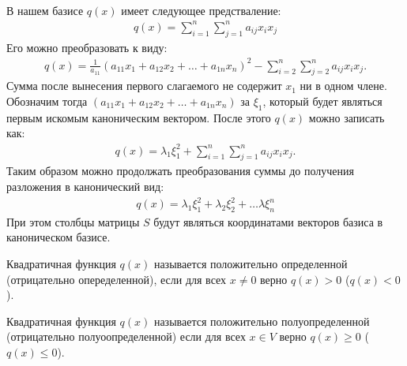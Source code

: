 \begin{algorithm}~\\
    В нашем базисе $q(x)$ имеет следующее предстваление:
    \begin{gather*}
        q(x) = \sum_{i=1}^{n}\sum_{j=1}^{n} a_{ij}x_i x_j
    \end{gather*}
    Его можно преобразовать к виду: 
    \begin{gather*}
        q(x) = \frac{1}{a_{11}} (a_{11} x_1 + a_{12} x_2 + \dots + a_{1n} x_n)^2 - 
        \sum_{i=2}^{n}\sum_{j=2}^{n} a_{ij}x_i x_j.
    \end{gather*}
    Сумма после вынесения первого слагаемого не содержит $x_1$ ни в одном члене. Обозначим тогда 
    $(a_{11} x_1 + a_{12} x_2 + \dots + a_{1n} x_n)$ за $\xi_1$, который будет являться первым 
    искомым каноническим вектором. После этого $q(x)$ можно записать как:
    \begin{gather*}
        q(x) = \lambda_1  \xi_1^2 + \sum_{i=1}^{n}\sum_{j=1}^{n} a_{ij}x_i x_j.
    \end{gather*}
    Таким образом можно продолжать преобразования суммы до получения разложения в канонический вид:
    \begin{gather*}
        q(x) = \lambda_1  \xi_1^2 + \lambda_2 \xi_2^2 + \dots \lambda \xi_n^n
    \end{gather*}
    При этом столбцы матрицы $S$ будут являться координатами векторов базиса в каноническом базисе.
\end{algorithm}

\begin{definition}
    Квадратичная функция $q(x)$ называется положительно определенной (отрицательно опеределенной), 
    если для всех $x \neq 0$ верно $q(x) > 0$ ($q(x) < 0$).
\end{definition}

\begin{definition}
    Квадратичная функция $q(x)$ называется положительно полуопределенной (отрицательно полуоопределенной) 
    если для всех $x \in V$ верно $q(x) \geq 0$ ($q(x) \leq 0$).
\end{definition}
